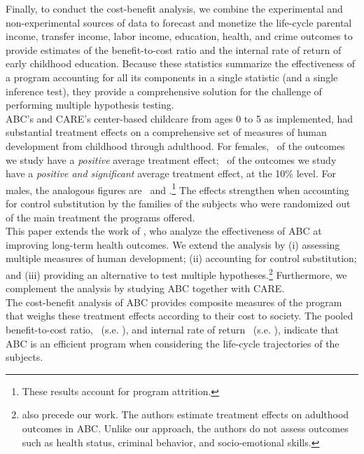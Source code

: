 \noindent Finally, to conduct the cost-benefit analysis, we combine the experimental and non-experimental sources of data to forecast and monetize the life-cycle parental income, transfer income, labor income, education, health, and crime outcomes to provide estimates of the benefit-to-cost ratio and the internal rate of return of early childhood education. Because these statistics summarize the effectiveness of a program accounting for all its components in a single statistic (and a single inference test), they provide a comprehensive solution for the challenge of performing multiple hypothesis testing.\\

\noindent ABC's and CARE's center-based childcare from ages 0 to 5 as implemented, had substantial treatment effects on a comprehensive set of measures of human development from childhood through adulthood. For females, \positivef\ of the outcomes we study have a \textit{positive} average treatment effect; \positivesf\ of the outcomes we study have a \textit{positive and significant} average treatment effect, at the 10\% level. For males, the analogous figures are \positivem\ and \positivesm.\footnote{These results account for program attrition.} The effects strengthen when accounting for control substitution by the families of the subjects who were randomized out of the main treatment  the programs offered.\\

\noindent This paper extends the work of \citet{Campbell_Conti_etal_2014_EarlyChildhoodInvestments}, who analyze the effectiveness of ABC at improving long-term health outcomes. We extend the analysis by (i) assessing multiple measures of human development; (ii) accounting for control substitution; and (iii) providing an alternative to test multiple hypotheses.\footnote{\cite{Campbell_Pungello_etal_2012_DP} also precede our work. The authors estimate treatment effects on adulthood outcomes in ABC. Unlike our approach, the authors do not assess outcomes such as health status, criminal behavior, and socio-emotional skills.} Furthermore, we complement the analysis by studying ABC together with CARE.\\ 

\noindent The cost-benefit analysis of ABC provides composite measures of the program that weighs these treatment effects according to their cost to society. The pooled benefit-to-cost ratio, \bcf\ (s.e. \bcsef), and internal rate of return \irrp\ (s.e. \irrsep), indicate that ABC is an efficient program when considering the life-cycle trajectories of the subjects. \\

